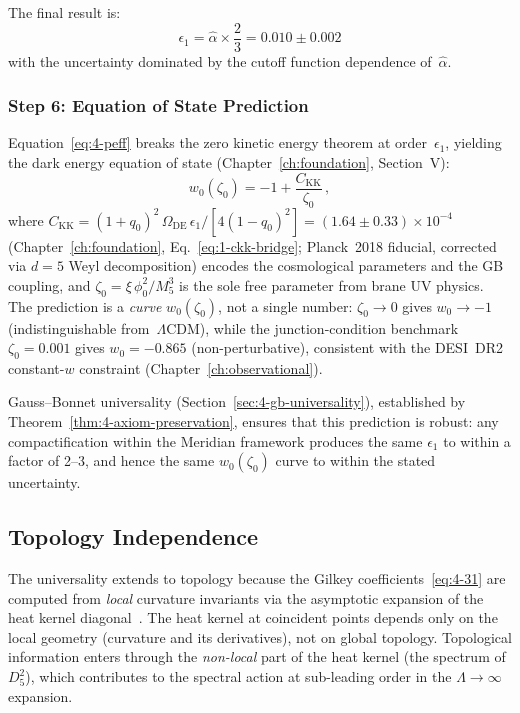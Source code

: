 The final result is:
\begin{equation}
  \boxed{\epsilon_1 = \hat{\alpha} \times \frac{2}{3} = 0.010 \pm 0.002}
  \label{eq:4-eps1-result}
\end{equation}
with the uncertainty dominated by the cutoff function dependence of~$\hat{\alpha}$.


\subsubsection{Step 6: Equation of State Prediction}

Equation~\eqref{eq:4-peff} breaks the zero kinetic energy theorem at order~$\epsilon_1$, yielding the dark energy equation of state (Chapter~\ref{ch:foundation}, Section~V):
\begin{equation}
  w_0(\zeta_0) = -1 + \frac{C_{\mathrm{KK}}}{\zeta_0}\,,
  \label{eq:4-w0-prediction}
\end{equation}
where $C_{\mathrm{KK}} = (1 + q_0)^2\, \Omega_{\mathrm{DE}}\, \epsilon_1 / [4(1 - q_0)^2] = (1.64 \pm 0.33) \times 10^{-4}$ (Chapter~\ref{ch:foundation}, Eq.~\eqref{eq:1-ckk-bridge}; Planck~2018 fiducial, corrected via $d = 5$ Weyl decomposition) encodes the cosmological parameters and the GB coupling, and $\zeta_0 = \xi\, \phi_0^2 / M_5^3$ is the sole free parameter from brane UV physics. The prediction is a \emph{curve} $w_0(\zeta_0)$, not a single number: $\zeta_0 \to 0$ gives $w_0 \to -1$ (indistinguishable from~$\Lambda\mathrm{CDM}$), while the junction-condition benchmark $\zeta_0 = 0.001$ gives $w_0 = -0.865$ (non-perturbative), consistent with the DESI~DR2 constant-$w$ constraint (Chapter~\ref{ch:observational}).

Gauss--Bonnet universality (Section~\ref{sec:4-gb-universality}), established by Theorem~\ref{thm:4-axiom-preservation}, ensures that this prediction is robust: any compactification within the Meridian framework produces the same $\epsilon_1$ to within a factor of 2--3, and hence the same $w_0(\zeta_0)$ curve to within the stated uncertainty.


\subsection{Topology Independence}
\label{sec:4-topology}

The universality extends to topology because the Gilkey coefficients~\eqref{eq:4-31} are computed from \emph{local} curvature invariants via the asymptotic expansion of the heat kernel diagonal~\cite{ch4:Gilkey1984}. The heat kernel at coincident points depends only on the local geometry (curvature and its derivatives), not on global topology. Topological information enters through the \emph{non-local} part of the heat kernel (the spectrum of $D_5^2$), which contributes to the spectral action at sub-leading order in the $\Lambda \to \infty$ expansion.

